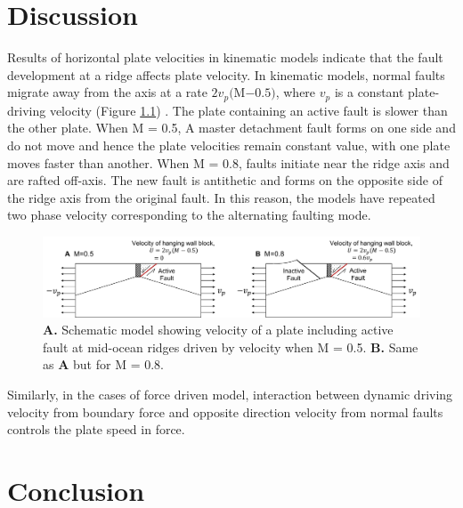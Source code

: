 \documentclass[letterpaper,12pt,notitle]{memphisthesis}                     %
\begin{document}
\chapter{Discussion}

Results of horizontal plate velocities in kinematic models indicate that the fault development at a ridge affects plate velocity. In kinematic models, normal faults migrate away from the axis at a rate $2v_p($M$-0.5)$, where $v_p$ is a constant plate-driving velocity (Figure \ref{fig:hangingwall}) \citep{Buck2005}. The plate containing an active fault is slower than the other plate. When M = 0.5, A master detachment fault forms on one side and do not move and hence the plate velocities remain constant value, with one plate moves faster than another. When M = 0.8, faults initiate near the ridge axis and are rafted off-axis. The new fault is antithetic and forms on the opposite side of the ridge axis from the original fault. In this reason, the models have repeated two phase velocity corresponding to the alternating faulting mode.

\begin{figure}[!htb]
	\centering
	\includegraphics[width=0.99\linewidth]{./figs/hangingwall.pdf}
	\caption{\textbf{A.} Schematic model showing velocity of a plate including active fault at mid-ocean ridges driven by velocity when M = 0.5. \textbf{B.} Same as \textbf{A} but for M = 0.8. }
	\label{fig:hangingwall}
\end{figure}


Similarly, in the cases of force driven model, interaction between dynamic driving velocity from boundary force and opposite direction velocity from normal faults controls the plate speed in force. 


\chapter{Conclusion}

\end{document}
